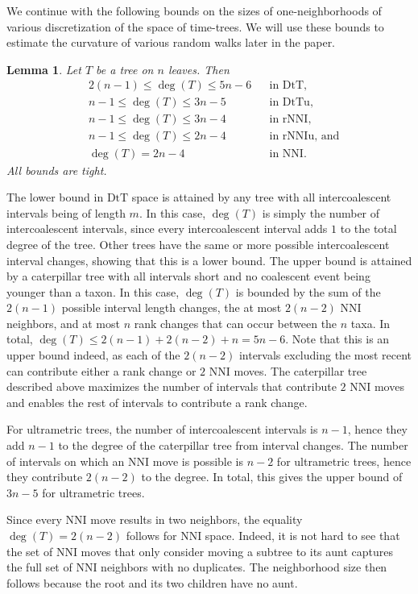 \documentclass{amsart}
\newtheorem{lemma}{Lemma}
\theoremstyle{definition}
\newcommand{\nni}{\mathrm{NNI}}
\newcommand{\rnni}{\mathrm{rNNI}}
\newcommand{\rnniu}{\mathrm{rNNIu}}
\newcommand{\mdts}{\mathrm{DtT}}
\newcommand{\mdtsu}{\mathrm{DtTu}}
\begin{document}
We continue with the following bounds on the sizes of one-neighborhoods of various discretization of the space of time-trees.
We will use these bounds to estimate the curvature of various random walks later in the paper.

\begin{lemma}\label{neighBound}
Let $T$ be a tree on $n$ leaves.
Then
\begin{align*}
& 2(n-1) \leq \deg(T) \leq 5n-6	&& \mbox{in $\mdts$,}\\
& n-1 \leq \deg(T) \leq 3n-5	&& \mbox{in $\mdtsu$,}\\
& n-1\leq \deg(T) \leq3n-4 	&& \mbox{in $\rnni$,}\\
& n-1 \leq \deg(T) \leq 2n-4 	&& \mbox{in $\rnniu$, and}\\
& \deg(T) = 2n-4 		&& \mbox{in $\nni$.}
\end{align*}
All bounds are tight.
\end{lemma}

\proof
The lower bound in $\mdts$ space is attained by any tree with all intercoalescent intervals being of length $m$.
In this case, $\deg(T)$ is simply the number of intercoalescent intervals, since every intercoalescent interval adds $1$ to the total degree of the tree.
Other trees have the same or more possible intercoalescent interval changes, showing that this is a lower bound.
The upper bound is attained by a caterpillar tree with all intervals short and no coalescent event being younger than a taxon.
In this case, $\deg(T)$ is bounded by the sum of the $2(n-1)$ possible interval length changes, the at most $2(n-2)$ NNI neighbors, and at most $n$ rank changes that can occur between the $n$ taxa.
In total, $\deg(T) \le 2(n-1) + 2(n-2) + n = 5n-6$.
Note that this is an upper bound indeed, as each of the $2(n-2)$ intervals excluding the most recent can contribute either a rank change or $2$ NNI moves.
The caterpillar tree described above maximizes the number of intervals that contribute $2$ NNI moves and enables the rest of intervals to contribute a rank change.

For ultrametric trees, the number of intercoalescent intervals is $n-1$, hence they add $n-1$ to the degree of the caterpillar tree from interval changes.
The number of intervals on which an NNI move is possible is $n-2$ for ultrametric trees, hence they contribute $2(n-2)$ to the degree.
In total, this gives the upper bound of $3n-5$ for ultrametric trees.

Since every NNI move results in two neighbors, the equality $\deg(T) = 2(n-2)$ follows for $\nni$ space.
Indeed, it is not hard to see that the set of NNI moves that only consider moving a subtree to its aunt captures the full set of NNI neighbors with no duplicates.
The neighborhood size then follows because the root and its two children have no aunt.
\end{document}
